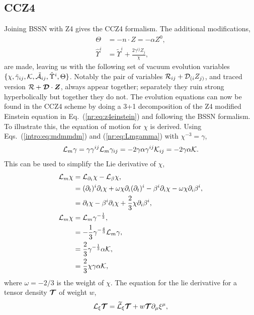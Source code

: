 \subsection{CCZ4}
Joining BSSN with Z4 gives the CCZ4 formalism. The additional modifications,
\begin{align} \Theta &= -n\cdot Z  = -\alpha Z^0,\\
\hat{\Upsilon}^i &= \tilde{\Upsilon}^i + \frac{2\gamma^{ij}Z_j}{\chi},\end{align}
are made, leaving us with the following set of vacuum evolution variables $\{\chi, \tilde{\gamma}_{ij},\mathcal{K},\tilde{\mathcal{A}}_{ij},\hat{\Upsilon}^i,\Theta \}$. Notably the pair of variables $\mathcal{R}_{ij} + \mathcal{D}_{(i}Z_{j)}$, and traced version $\mathcal{R} + \boldsymbol{\mathcal{D}}\cdot \boldsymbol{Z}$, always appear together; separately they ruin strong hyperbolically but together they do not. The evolution equations can now be found in the CCZ4 scheme by doing a 3+1 decomposition of the Z4 modified Einstein equation in Eq.~(\ref{nr:eq:z4einstein}) and following the BSSN formalism. To illustrate this, the equation of motion for $\chi$ is derived. Using Eqs.~(\ref{intro:eq:mdmmdm}) and (\ref{nr:eq:Lmgamma}) with $\chi^{-3}=\gamma$,
\begin{align}
\mathcal{L}_m {\gamma} = \gamma \gamma^{ij} \mathcal{L}_m \gamma_{ij} = -2 \gamma \alpha \gamma^{ij} \mathcal{K}_{ij} = -2\gamma \alpha \mathcal{K}.
\end{align}
This can be used to simplify the Lie derivative of $\chi$,
\begin{align}
\mathcal{L}_m \chi &= \mathcal{L}_{\partial_t}\chi - \mathcal{L}_\beta \chi,\\
 &= (\partial_t)^i \partial_i \chi + \omega \chi \partial_i (\partial_t)^i - \beta^i \partial_i \chi - \omega \chi \partial_i \beta^i ,\\
 &= \partial_t \chi - \beta^i \partial_i \chi +\frac{2}{3} \chi\partial_i \beta^i ,\\
\mathcal{L}_m \chi &= \mathcal{L}_m \gamma^{-\frac{1}{3}}  ,\\
&=-\frac{1}{3}\gamma^{-\frac{4}{3}}\mathcal{L}_m \gamma  ,\\
&=\frac{2}{3}\gamma^{-\frac{1}{3}} \alpha \mathcal{K} ,\\
&=\frac{2}{3}\chi\gamma \alpha \mathcal{K} ,
\end{align}
where $\omega=-2/3$ is the weight of $\chi$. The equation for the lie derivative for a tensor density $\boldsymbol{\mathcal{T}}$ of weight $w$,
\begin{equation} 
\mathcal{L}_\xi \boldsymbol{\mathcal{T}} =  \widetilde{\mathcal{L}}_\xi \boldsymbol{\mathcal{T}} + w \boldsymbol{\mathcal{T}}  \partial_\mu \xi^\mu ,
\end{equation}
